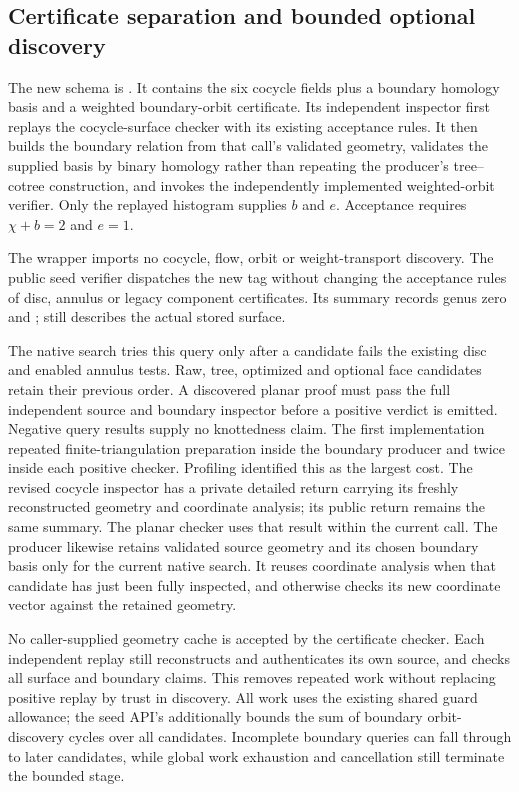 \subsection{Certificate separation and bounded optional discovery}

The new schema is . It contains the six
cocycle fields plus a boundary homology basis and a weighted boundary-orbit
certificate. Its independent inspector first replays the
cocycle-surface checker with its existing acceptance rules. It then builds
the boundary relation from that call's validated geometry, validates
the supplied basis by binary homology rather than repeating the producer's
tree--cotree construction, and invokes the independently implemented
weighted-orbit verifier. Only the replayed histogram supplies $b$ and $e$.
Acceptance requires $\chi+b=2$ and $e=1$.

The wrapper imports no cocycle, flow, orbit or weight-transport discovery.
The public seed verifier dispatches the new tag without changing the
acceptance rules of disc, annulus or legacy component certificates. Its
summary records genus zero and ;
 still describes the actual stored surface.

The native search tries this query only after a candidate fails the
existing disc and enabled annulus tests. Raw, tree, optimized and optional
face candidates retain their previous order. A discovered planar proof
must pass the full independent source and boundary inspector before a
positive verdict is emitted. Negative query results supply no knottedness
claim. The first implementation repeated finite-triangulation preparation
inside the boundary producer and twice inside each positive checker.
Profiling identified this as the largest cost. The revised cocycle
inspector has a private detailed return carrying its freshly reconstructed
geometry and coordinate analysis; its public return remains the same
summary. The planar checker uses that result within the current call.
The producer likewise retains validated source geometry and its chosen
boundary basis only for the current native search. It reuses coordinate
analysis when that candidate has just been fully inspected, and otherwise
checks its new coordinate vector against the retained geometry.

No caller-supplied geometry cache is accepted by the certificate checker.
Each independent replay still reconstructs and authenticates its own
source, and checks all surface and boundary claims. This removes repeated
work without replacing positive replay by trust in discovery. All work uses the existing shared guard allowance; the seed API's
 additionally bounds the sum of boundary orbit-discovery
cycles over all candidates. Incomplete boundary queries can fall through
to later candidates, while global work exhaustion and cancellation still
terminate the bounded stage.

